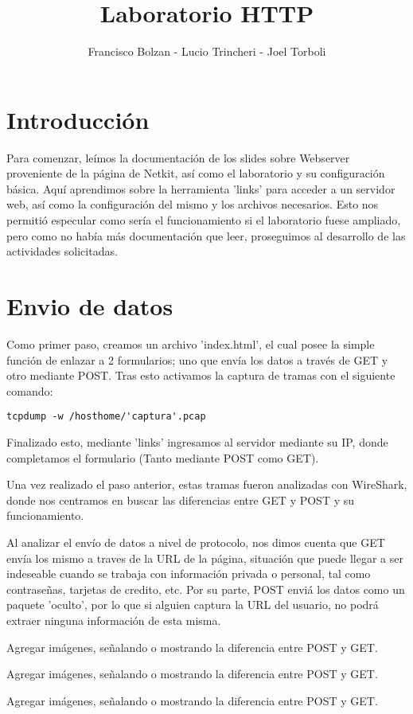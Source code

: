 \documentclass[12pt,a4paper]{article}
\title{Laboratorio HTTP}
\author{Francisco Bolzan - Lucio Trincheri - Joel Torboli}
\begin{document}
	\maketitle
	\section{Introducción}
	Para comenzar, leímos la documentación de los slides sobre Webserver proveniente de la página de Netkit, así como el laboratorio y su configuración básica. Aquí aprendimos sobre la herramienta 'links' para acceder a un servidor web, así como la configuración del mismo y los archivos necesarios. Esto nos permitió especular como sería el funcionamiento si el laboratorio fuese ampliado, pero como no había más documentación que leer, proseguimos al desarrollo de las actividades solicitadas.
	\section{Envio de datos}
	Como primer paso, creamos un archivo 'index.html', el cual posee la simple función de enlazar a 2 formularios; uno que envía los datos a través de GET y otro mediante POST.
	Tras esto activamos la captura de tramas con el siguiente comando: 
	
	\verb|tcpdump -w /hosthome/'captura'.pcap| 
	
	Finalizado esto, mediante 'links' ingresamos al servidor mediante su IP, donde completamos el formulario (Tanto mediante POST como GET).
	
	Una vez realizado el paso anterior, estas tramas fueron analizadas con WireShark, donde nos centramos en buscar las diferencias entre GET y POST y su funcionamiento.
	
	Al analizar el envío de datos a nivel de protocolo, nos dimos cuenta que GET envía los mismo a traves de la URL de la página, situación que puede llegar a ser indeseable cuando se trabaja con información privada o personal, tal como contraseñas, tarjetas de credito, etc. Por su parte, POST enviá los datos como un paquete 'oculto', por lo que si alguien captura la URL del usuario, no podrá extraer ninguna información de esta misma.
	
	Agregar imágenes, señalando o mostrando la diferencia entre POST y GET.
	
	Agregar imágenes, señalando o mostrando la diferencia entre POST y GET.
	
	Agregar imágenes, señalando o mostrando la diferencia entre POST y GET.
	
\end{document}
